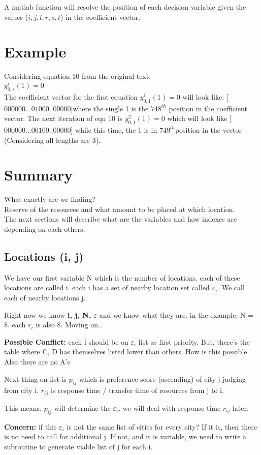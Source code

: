 \documentclass[11pt]{article}
\DeclareRobustCommand{\mybox}[2][gray!20]{%
\begin{tcolorbox}[   %
        breakable,
        left=0pt,
        right=0pt,
        top=0pt,
        bottom=0pt,
        colback=#1,
        colframe=#1,
        width=\dimexpr\textwidth\relax, 
        enlarge left by=0mm,
        boxsep=5pt,
        arc=0pt,outer arc=0pt,
        ]
        #2
\end{tcolorbox}
}
\begin{document}
\par \noindent A matlab function will resolve the position of each decision variable given the values ($i, j, l, r, s, t$) in the coefficient vector.
\section{Example}
Considering equation 10 from the original text:\\
$y^i_{0,s}(1) = 0$\\
The coefficient vector for the first equation $ y^1_{0,1}(1) = 0$ will look like: [$000000...01000..00000$]where the single 1 is the $748^{th}$ position in the coefficient vector. The next iteration of eqn 10 is $ y^2_{0,1}(1) = 0$ which will look like [$000000...00100..00000$] while this time, the 1 is in $749^{th}$position in the vector (Considering all lengths are 3).


\pagebreak
\section{Summary}
What exactly are we finding?\\
Reserve of the resources and what amount to be placed at which location.\\
The next sections will describe what are the variables and how indexes are depending on each others.
\subsection{Locations (i, j)}
\mybox[green!10]{We have our first variable N which is the number of locations. each of these locations are called i. each i has a set of nearby location set called $\varepsilon_i$. We call each of nearby locations j.} 
Right now we know \textbf{i, j, N, $\varepsilon$ }and we know what they are. in the example, N = 8. each $\varepsilon_i$ is also 8. Moving on..

\mybox[red!40]{\textbf{Possible Conflict:} each i should be on $\varepsilon_i$ list as first priority. But, there's the table where C, D has themselves listed lower than others. How is this possible. Also there are no A's}
\mybox[green!10]{Next thing on list is $p_{ij}$ which is preference score (ascending) of city j judging from city i. $r_{ij}$ is response time / transfer time of resources from j to i.}
This means, $p_{ij}$ will determine the $\varepsilon_i$. we will deal with response time $r_{ij}$ later.
\mybox[red!10]{\textbf{Concern:} if this $\varepsilon_i$ is not the same list of cities for every city? If it is, then there is no need to call for additional j. If not, and it is variable, we need to write a subroutine to generate viable list of j for each i.}
\end{document}
